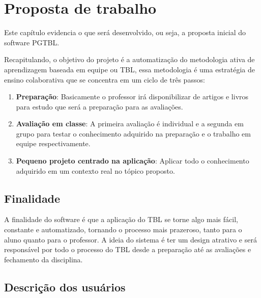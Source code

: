 \chapter{Proposta de trabalho}

Este capítulo evidencia o que será desenvolvido, ou seja, a proposta inicial do software PGTBL.

Recapitulando, o objetivo do projeto é a automatização do metodologia ativa de aprendizagem baseada em equipe ou TBL, essa metodologia é uma estratégia de ensino colaborativa que se concentra em um ciclo de três passos:

\begin{enumerate}
  \item \textbf{Preparação}: Basicamente o professor irá disponibilizar de artigos e livros para estudo que será a preparação para as avaliações.
  \item \textbf{Avaliação em classe}: A primeira avaliação é individual e a segunda em grupo para testar o conhecimento adquirido na preparação e o trabalho em equipe respectivamente.
  \item \textbf{Pequeno projeto centrado na aplicação}: Aplicar todo o conhecimento adquirido em um contexto real no tópico proposto.
\end{enumerate}

\section{Finalidade}

A finalidade do software é que a aplicação do TBL se torne algo mais fácil, constante e automatizado, tornando o processo mais prazeroso, tanto para o aluno quanto para o professor. A ideia do sistema é ter um design atrativo e será responsável por todo o processo do TBL desde a preparação até as avaliações e fechamento da disciplina.

\section{Descrição dos usuários}

